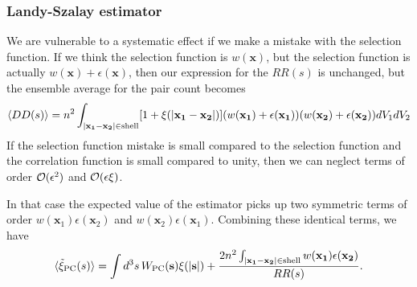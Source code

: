 \subsubsection{Landy-Szalay estimator}
We are vulnerable to a systematic effect if we make a mistake with the selection function.  If we think the selection function is $w(\mathbf x)$, but the selection function is actually $w(\mathbf x) + \epsilon(\mathbf x)$, then our expression for the $RR(s)$ is unchanged, but the ensemble average for the pair count becomes
\begin{equation}
 \langle DD(s) \rangle =  n^2 \int_{|\mathbf{x_1 - x_2}| \in \mbox{\scriptsize shell}} [1 + \xi(|\mathbf{x_1 - x_2}|)] (w(\mathbf{x_1}) +\epsilon(\mathbf{x_1}) )( w(\mathbf{x_2}) + \epsilon(\mathbf{x_2}) ) {dV_1}{dV_2}
\end{equation}
If the selection function mistake is small compared to the selection function and the correlation function is small compared to unity, then we can neglect terms of order ${\cal O}(\epsilon^2)$ and  ${\cal O}(\epsilon\xi)$.

In that case the expected value of the estimator picks up two symmetric terms of order $w(\mathbf x_1)\epsilon(\mathbf x_2)$ and $w(\mathbf x_2)\epsilon(\mathbf x_1)$.  Combining these identical terms, we have
\begin{equation}
  \langle  \tilde \xi_{\rm PC}(s) \rangle = \int d^3s\, W_{\rm PC}(\mathbf s)  \xi(|\mathbf{s}|)
  + \frac{2 n^2 \int_{|\mathbf{x_1 - x_2}| \in \mbox{\scriptsize shell}} w(\mathbf{x_1})  \epsilon(\mathbf{x_2})  }{RR(s)}. \label{eqn:correlation_function_correction}
\end{equation}

